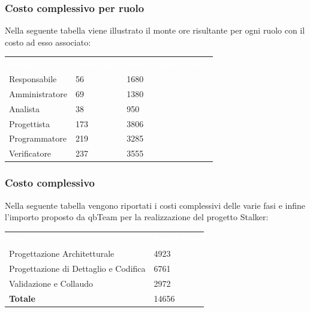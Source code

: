 \subsubsection{Costo complessivo per ruolo}
Nella seguente tabella viene illustrato il monte ore risultante per ogni ruolo con il costo ad esso associato:
{
	\renewcommand{\arraystretch}{2}
	\centering
\begin{table}[h]
	\caption{Tabella del costo complessivo per ruolo}
	\begin{longtable}{ C{3cm} C{2cm} C{4cm}}
		\textcolor{white}{\textbf{Ruolo}} & \textcolor{white}{\textbf{Totale ore}} & \textcolor{white}{\textbf{Costo ruolo in euro}}\\	
        
        Responsabile & 56 &  1680\\
        Amministratore & 69 & 1380 \\
        Analista & 38 & 950 \\
        Progettista & 173 & 3806 \\
        Programmatore & 219 & 3285 \\
        Verificatore & 237 & 3555 \\
        	
	\end{longtable}
\end{table}
}

\subsubsection{Costo complessivo}
Nella seguente tabella vengono riportati i costi complessivi delle varie fasi e infine l'importo proposto da qbTeam per la realizzazione del progetto Stalker:\\
{
	\renewcommand{\arraystretch}{2}
	\begin{table}[h]
	\caption{Tabella del costo complessivo}
	\centering
	\begin{longtable}{ C{5cm} C{5cm}}
		\textcolor{white}{\textbf{Fase}} & \textcolor{white}{\textbf{Costo Fase}}\\	
		
		Progettazione Architetturale & 4923 \\
		Progettazione di Dettaglio e Codifica & 6761 \\
		Validazione e Collaudo & 2972 \\
		\textbf{Totale} & 14656\\
		
	\end{longtable}
\end{table}
}



